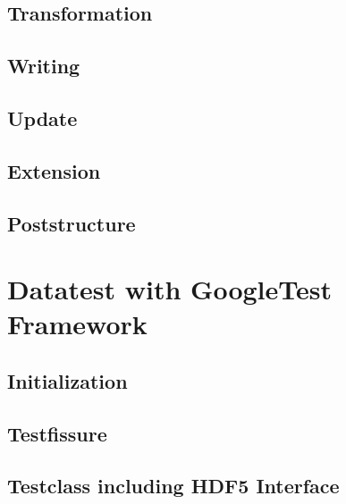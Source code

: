 \documentclass{article}
\begin{document}
\subsection{Transformation}
\subsection{Writing}
\subsection{Update}
\subsection{Extension}
\subsection{Poststructure}



\section{Datatest with GoogleTest Framework}
\subsection{Initialization}
\subsection{Testfissure}
\subsection{Testclass including HDF5 Interface}






\end{document}

